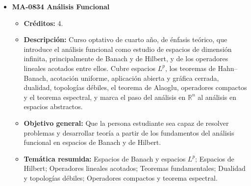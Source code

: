 \begin{itemize}[leftmargin=1.3em, itemsep=10pt, topsep=4pt, label={\color{Azul-UCR}$\blacksquare$}]
\item {\color{Azul-UCR}\textbf{MA-0834 Análisis Funcional}}\par\nopagebreak\smallskip
\begin{itemize}[leftmargin=1.1em, itemsep=3pt, topsep=2pt, parsep=2pt, label={\textendash}]
\item \textbf{Créditos:} 4.
\item \textbf{Descripción:} Curso optativo de cuarto año, de énfasis teórico, que introduce el análisis funcional como estudio de espacios de dimensión infinita, principalmente de Banach y de Hilbert, y de los operadores lineales acotados entre ellos. Cubre espacios $L^p$, los teoremas de Hahn--Banach, acotación uniforme, aplicación abierta y gráfica cerrada, dualidad, topologías débiles, el teorema de Alaoglu, operadores compactos y el teorema espectral, y marca el paso del análisis en $\mathbb{R}^n$ al análisis en espacios abstractos.
\item \textbf{Objetivo general:} Que la persona estudiante sea capaz de resolver problemas y desarrollar teoría a partir de los fundamentos del análisis funcional en espacios de Banach y de Hilbert.
\item \textbf{Temática resumida:} Espacios de Banach y espacios $L^p$; Espacios de Hilbert; Operadores lineales acotados; Teoremas fundamentales; Dualidad y topologías débiles; Operadores compactos y teorema espectral.
\end{itemize}


\end{itemize}

